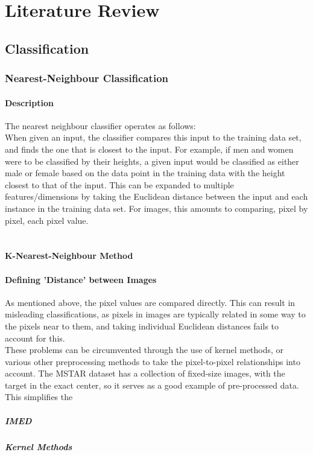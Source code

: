\chapter{Literature Review}
\section{Classification}

\subsection{Nearest-Neighbour Classification}
\subsubsection{Description}
The nearest neighbour classifier operates as follows:\\
When given an input, the classifier compares this input to the training data set, and finds the one that is closest to the input. For example, if men and women were to be classified by their heights, a given input would be classified as either male or female based on the data point in the training data with the height closest to that of the input. This can be expanded to multiple features/dimensions by taking the Euclidean distance between the input and each instance in the training data set. For images, this amounts to comparing, pixel by pixel, each pixel value.\\\\
\subsubsection{K-Nearest-Neighbour Method}

\subsubsection{Defining 'Distance' between Images}
As mentioned above, the pixel values are compared directly. This can result in misleading classifications, as pixels in images are typically related in some way to the pixels near to them, and taking individual Euclidean distances fails to account for this.\\
These problems can be circumvented through the use of kernel methods, or various other preprocessing methods to take the pixel-to-pixel relationships into account. The MSTAR dataset has a collection of fixed-size images, with the target in the exact center, so it serves as a good example of pre-processed data. This simplifies the  
\paragraph{IMED}\cite{IMED}
\paragraph{Kernel Methods}
